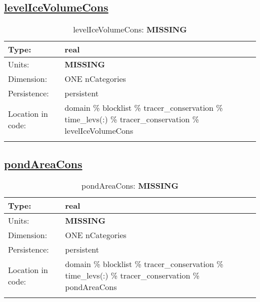 \subsection[levelIceVolumeCons]{\hyperref[sec:var_tab_tracer_conservation]{levelIceVolumeCons}}
\label{subsec:var_sec_tracer_conservation_levelIceVolumeCons}
\begin{center}
\begin{longtable}{| p{2.0in} | p{4.0in} |}
        \hline 
        Type: & real \\
        \hline 
        Units: & {\bf \color{red} MISSING} \\
        \hline 
        Dimension: & ONE nCategories \\
        \hline 
        Persistence: & persistent \\
        \hline 
         Location in code: & domain \% blocklist \% tracer\_conservation \% time\_levs(:) \% tracer\_conservation \% levelIceVolumeCons \\
         \hline 
    \caption{levelIceVolumeCons: {\bf \color{red} MISSING}}
\end{longtable}
\end{center}
\subsection[pondAreaCons]{\hyperref[sec:var_tab_tracer_conservation]{pondAreaCons}}
\label{subsec:var_sec_tracer_conservation_pondAreaCons}
\begin{center}
\begin{longtable}{| p{2.0in} | p{4.0in} |}
        \hline 
        Type: & real \\
        \hline 
        Units: & {\bf \color{red} MISSING} \\
        \hline 
        Dimension: & ONE nCategories \\
        \hline 
        Persistence: & persistent \\
        \hline 
         Location in code: & domain \% blocklist \% tracer\_conservation \% time\_levs(:) \% tracer\_conservation \% pondAreaCons \\
         \hline 
    \caption{pondAreaCons: {\bf \color{red} MISSING}}
\end{longtable}
\end{center}
